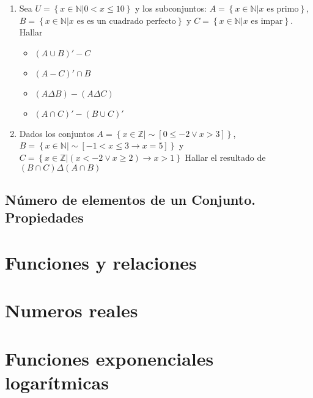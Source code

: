 \documentclass[
  16pt,
]{krantz}
\providecommand{\tightlist}{%
  \setlength{\itemsep}{0pt}\setlength{\parskip}{0pt}}
\theoremstyle{definition}
\theoremstyle{definition}
\theoremstyle{definition}
\theoremstyle{definition}
\theoremstyle{remark}
\begin{document}
\begin{enumerate}
\def\labelenumi{\arabic{enumi}.}
\item
  Sea \(U=\left\{x\in\mathbb{N}|0<x\leq 10\right\}\) y los subconjuntos: \(A=\left\{x\in\mathbb{N}|\text{$x$ es primo}\right\}\), \(B=\left\{x\in\mathbb{N}|\text{$x$ es es un cuadrado perfecto}\right\}\) y \(C=\left\{x\in\mathbb{N}|\text{$x$ es impar}\right\}\). Hallar

  \begin{itemize}
  \tightlist
  \item
    \((A\cup B)'-C\)
  \item
    \((A-C)'\cap B\)
  \item
    \((A\Delta B)-(A\Delta C)\)
  \item
    \((A\cap C)'-(B\cup C)'\)
  \end{itemize}
\item
  Dados los conjuntos \(A=\left\{x\in\mathbb{Z}|\sim[0\leq -2\vee x>3]\right\}\), \(B=\left\{x\in\mathbb{N}|\sim[-1<x\leq 3\rightarrow x=5]\right\}\) y \(C=\left\{x\in\mathbb{Z}|(x< -2\vee x\geq 2)\rightarrow x>1\right\}\) Hallar el resultado de \((B\cap C)\Delta(A\cap B)\)
\end{enumerate}

\hypertarget{nuxfamero-de-elementos-de-un-conjunto.-propiedades}{%
\section{Número de elementos de un Conjunto. Propiedades}\label{nuxfamero-de-elementos-de-un-conjunto.-propiedades}}

\hypertarget{funciones-y-relaciones}{%
\chapter{Funciones y relaciones}\label{funciones-y-relaciones}}

\hypertarget{numeros-reales}{%
\chapter{Numeros reales}\label{numeros-reales}}

\hypertarget{funciones-exponenciales-logaruxedtmicas}{%
\chapter{Funciones exponenciales logarítmicas}\label{funciones-exponenciales-logaruxedtmicas}}
\end{document}
